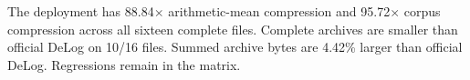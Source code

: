 The deployment has 88.84$\times$ arithmetic-mean compression and 95.72$\times$ corpus compression across all sixteen complete files.
Complete archives are smaller than official DeLog on 10/16 files. Summed archive bytes are 4.42\% larger than official DeLog. Regressions remain in the matrix.
